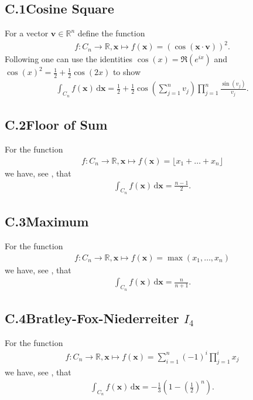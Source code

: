 \documentclass[11pt]{article}
\def\R{\mathbb{R}}
\def\bfx{\bm{x}}
\def\bfv{\bm{v}}
\def\d{\,\mathrm{d}}
\def\bx{\mathbf{x}}
\begin{document}
\subsection*{C.1\hspace{0.5cm}Cosine Square}
For a vector $\bfv\in\R^n$ define the function
\begin{align*}
f\colon C_{n}\to\R, \bx \mapsto f(\bx) = (\cos\left(\bfx\cdot\bfv\right))^2.
\end{align*}
Following \cite{IntegralCos2} one can use the identities $\cos(x)=\Re(e^{ix})$ and $\cos(x)^2 = \frac{1}{2}+\frac{1}{2}\cos(2x)$ to show
\begin{align*}
\int_{C_{n}} f(\bx) \d\bx =\frac{1}{2}+\frac{1}{2}\cos\left(\sum_{j=1}^{n}v_j\right)\prod_{j=1}^{n}\frac{\sin(v_j)}{v_j}.
\end{align*}
%
%
%
\subsection*{C.2\hspace{0.5cm}Floor of Sum}
For the function
\begin{align*}
f\colon C_{n}\to\R, \bx \mapsto f(\bx) = \lfloor x_1 + \ldots + x_n \rfloor
\end{align*}
we have, see \cite{IntegralFloorCube}, that
\begin{align*}
\int_{C_{n}} f(\bx) \d\bx = \frac{n-1}{2}.
\end{align*}
%
%
\subsection*{C.3\hspace{0.5cm}Maximum}
For the function
\begin{align*}
f\colon C_{n}\to\R, \bx \mapsto f(\bx) = \max(x_1,\ldots,x_n)
\end{align*}
we have, see \cite{IntegralCubeMax}, that
\begin{align*}
\int_{C_{n}} f(\bx) \d\bx = \frac{n}{n+1}.
\end{align*}
%
%
\subsection*{C.4\hspace{0.5cm}Bratley-Fox-Niederreiter $I_4$}
For the function
\begin{align*}
f\colon C_{n}\to\R, \bx \mapsto f(\bx) = \sum^{n}_{i=1} (-1)^i \prod_{j=1}^{i} x_j
\end{align*}
we have, see \cite{BratleyFoxNiederreiter1992}, that
\begin{align*}
\int_{C_{n}} f(\bx) \d\bx = -\frac{1}{3}\left(1-\left(\frac{1}{2}\right)^n\right).
\end{align*}
%
%
%
%
%
%
\end{document}
